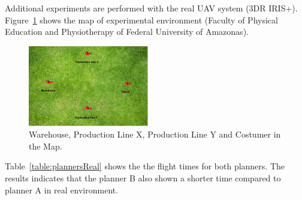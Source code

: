 \documentclass[conference,harvard,brazil,english]{sbatex}
\begin{document}
Additional experiments are performed with the real UAV system (3DR IRIS+). Figure~\ref{fig:maps} shows the map of experimental environment (Faculty of Physical Education and Physiotherapy of Federal University of Amazonas).

		\begin{figure}[H]
	\centering
	\includegraphics[width=0.47\textwidth]{map.eps}
	\caption{Warehouse, Production Line X, Production Line Y and Costumer in the Map.\label{fig:maps}}
	\end{figure}
	
Table~\ref{table:plannersReal} shows the the flight times for both planners. The results indicates that the planner B also shown a shorter time compared to planner A in real environment.
	
	\begin{table}[H]
\centering
{}
\caption{Mission Planners Flight Time - Real.\label{table:plannersReal}}
\end{table}
\end{document}
